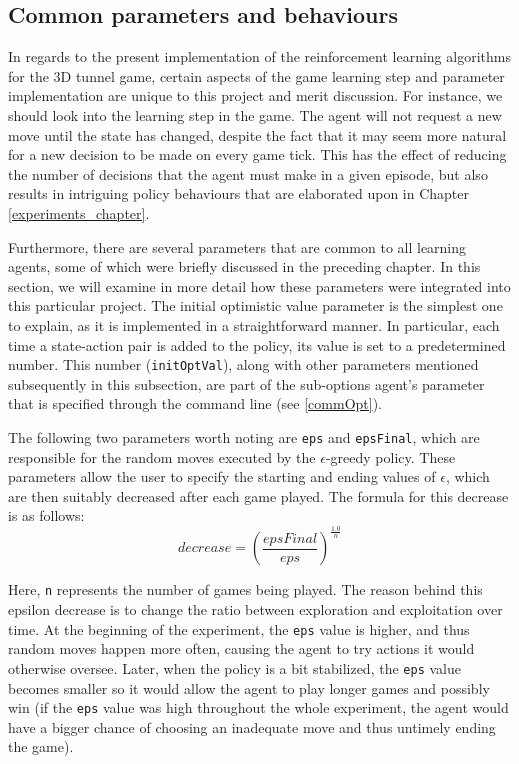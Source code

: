\subsection{Common parameters and behaviours}
In regards to the present implementation of the reinforcement learning algorithms for the 3D tunnel game, certain aspects of the game learning step and parameter implementation are unique to this project and merit discussion. For instance, we should look into the learning step in the game. The agent will not request a new move until the state has changed, despite the fact that it may seem more natural for a new decision to be made on every game tick. This has the effect of reducing the number of decisions that the agent must make in a given episode, but also results in intriguing policy behaviours that are elaborated upon in Chapter \ref{experiments_chapter}.

Furthermore, there are several parameters that are common to all learning agents, some of which were briefly discussed in the preceding chapter. In this section, we will examine in more detail how these parameters were integrated into this particular project. The initial optimistic value parameter is the simplest one to explain, as it is implemented in a straightforward manner. In particular, each time a state-action pair is added to the policy, its value is set to a predetermined number. This number (\texttt{initOptVal}), along with other parameters mentioned subsequently in this subsection, are part of the sub-options agent's parameter that is specified through the command line (see \ref{commOpt}).

The following two parameters worth noting are \texttt{eps} and \texttt{epsFinal}, which are responsible for the random moves executed by the $\epsilon$-greedy policy. These parameters allow the user to specify the starting and ending values of $\epsilon$, which are then suitably decreased after each game played. The formula for this decrease is as follows: $$decrease = (\frac{epsFinal}{eps})^{\frac{1.0}{n}}$$

Here, \texttt{n} represents the number of games being played. The reason behind this epsilon decrease is to change the ratio between exploration and exploitation over time. At the beginning of the experiment, the \texttt{eps} value is higher, and thus random moves happen more often, causing the agent to try actions it would otherwise oversee. Later, when the policy is a bit stabilized, the \texttt{eps} value becomes smaller so it would allow the agent to play longer games and possibly win (if the \texttt{eps} value was high throughout the whole experiment, the agent would have a bigger chance of choosing an inadequate move and thus untimely ending the game).

